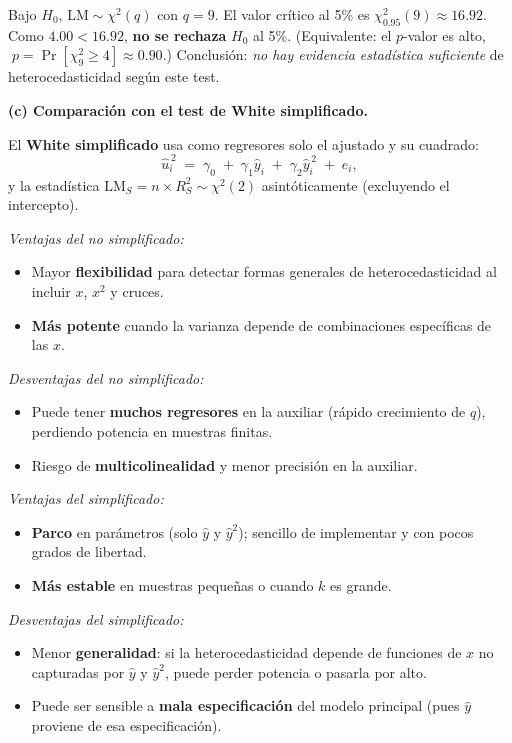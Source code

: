 \documentclass[10pt,a4paper]{article}
\begin{document}
\begin{enumerate}
Bajo \(H_0\), \(\text{LM}\sim \chi^2(q)\) con \(q=9\).
El valor crítico al 5\% es \(\chi^2_{0.95}(9)\approx 16{.}92\).
Como \(4{.}00 < 16{.}92\), \textbf{no se rechaza} \(H_0\) al 5\%.
(Equivalente: el \(p\)-valor es alto, \(\;p=\Pr[\chi^2_9\ge 4]\approx 0{.}90\).)
Conclusión: \emph{no hay evidencia estadística suficiente} de heterocedasticidad según este test.

\medskip
\textbf{(c) Comparación con el test de White simplificado.}

El \textbf{White simplificado} usa como regresores solo el ajustado y su cuadrado:
\[
\hat u_i^{\,2} \;=\; \gamma_0 \;+\; \gamma_1 \hat y_i \;+\; \gamma_2 \hat y_i^{\,2} \;+\; e_i,
\]
y la estadística \(\text{LM}_S = n\times R_S^2 \sim \chi^2(2)\) asintóticamente (excluyendo el intercepto).

\emph{Ventajas del no simplificado:}
\begin{itemize}
  \item Mayor \textbf{flexibilidad} para detectar formas generales de heterocedasticidad al incluir \(x\), \(x^2\) y cruces.
  \item \textbf{Más potente} cuando la varianza depende de combinaciones específicas de las \(x\).
\end{itemize}

\emph{Desventajas del no simplificado:}
\begin{itemize}
  \item Puede tener \textbf{muchos regresores} en la auxiliar (rápido crecimiento de \(q\)), perdiendo potencia en muestras finitas.
  \item Riesgo de \textbf{multicolinealidad} y menor precisión en la auxiliar.
\end{itemize}

\emph{Ventajas del simplificado:}
\begin{itemize}
  \item \textbf{Parco} en parámetros (solo \(\hat y\) y \(\hat y^2\)); sencillo de implementar y con pocos grados de libertad.
  \item \textbf{Más estable} en muestras pequeñas o cuando \(k\) es grande.
\end{itemize}

\emph{Desventajas del simplificado:}
\begin{itemize}
  \item Menor \textbf{generalidad}: si la heterocedasticidad depende de funciones de \(x\) no capturadas por \(\hat y\) y \(\hat y^2\), puede perder potencia o pasarla por alto.
  \item Puede ser sensible a \textbf{mala especificación} del modelo principal (pues \(\hat y\) proviene de esa especificación).
\end{itemize}


\end{enumerate}
\end{document}

